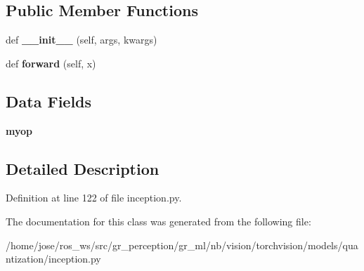 \subsection*{Public Member Functions}
\begin{DoxyCompactItemize}
\item 
\mbox{\label{classtorchvision_1_1models_1_1quantization_1_1inception_1_1QuantizableInceptionC_a995aca45bc083e6ac31cb65dbb7efea0}} 
def {\bfseries \+\_\+\+\_\+init\+\_\+\+\_\+} (self, args, kwargs)
\item 
\mbox{\label{classtorchvision_1_1models_1_1quantization_1_1inception_1_1QuantizableInceptionC_ada3e8a73156a8902cb07250af595f647}} 
def {\bfseries forward} (self, x)
\end{DoxyCompactItemize}
\subsection*{Data Fields}
\begin{DoxyCompactItemize}
\item 
\mbox{\label{classtorchvision_1_1models_1_1quantization_1_1inception_1_1QuantizableInceptionC_ab6e1cb45be97d42a941659f1fd2f5684}} 
{\bfseries myop}
\end{DoxyCompactItemize}


\subsection{Detailed Description}


Definition at line 122 of file inception.\+py.



The documentation for this class was generated from the following file\+:\begin{DoxyCompactItemize}
\item 
/home/jose/ros\+\_\+ws/src/gr\+\_\+perception/gr\+\_\+ml/nb/vision/torchvision/models/quantization/inception.\+py\end{DoxyCompactItemize}
